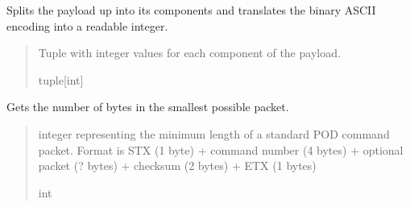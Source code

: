 \documentclass[letterpaper,10pt,english]{sphinxmanual}
\begin{document}
\begin{fulllineitems}
\begin{fulllineitems}
\end{fulllineitems}


\begin{fulllineitems}
\label{\detokenize{PodApi.Packets:PodApi.Packets.Standard.PacketStandard.DefaultPayload}}
\pysigstartsignatures
{}
\pysigstopsignatures
\sphinxAtStartPar
Splits the payload up into its components and translates the binary ASCII encoding         into a readable integer.
\begin{quote}\begin{description}
\sphinxAtStartPar
Tuple with integer values for each component of the payload.

\sphinxAtStartPar
tuple{[}int{]}

\end{description}\end{quote}

\end{fulllineitems}


\begin{fulllineitems}
\label{\detokenize{PodApi.Packets:PodApi.Packets.Standard.PacketStandard.GetMinimumLength}}
\pysigstartsignatures
{}
\pysigstopsignatures
\sphinxAtStartPar
Gets the number of bytes in the smallest possible packet.
\begin{quote}\begin{description}
\sphinxAtStartPar
integer representing the minimum length of a standard                 POD command packet. Format is STX (1 byte) + command number (4 bytes)                 + optional packet (? bytes) + checksum (2 bytes) + ETX (1 bytes)

\sphinxAtStartPar
int

\end{description}\end{quote}


\end{fulllineitems}
\end{fulllineitems}
\end{document}
